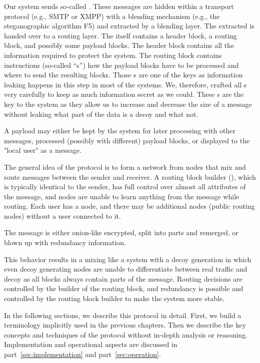 Our system sends so-called \VortexMessages. These messages are hidden within a transport protocol (e.g., SMTP or XMPP) with a blending mechanism (e.g., the steganographic algorithm F5) and extracted by a blending layer. The extracted \VortexMessage{} is handed over to a routing layer. The \VortexMessage{} itself contains a header block, a routing block, and possibly some payload blocks. The header block contains all the information required to protect the system. The routing block contains instructions (so-called ``s'') how the payload blocks have to be processed and where to send the resulting blocks. Those s are one of the keys as information leaking happens in this step in most of the systems. We, therefore, crafted all s very carefully to keep as much information secret as we could. These s are the key to the system as they allow us to increase and decrease the size of a message without leaking what part of the data is a decoy and what not.

A payload may either be kept by the system for later processing with other messages, processed (possibly with different) payload blocks, or displayed to the "local user" as a message.

The general idea of the protocol is to form a network from nodes that mix and route messages between the sender and receiver. A routing block builder (), which is typically identical to the sender, has full control over almost all attributes of the message, and nodes are unable to learn anything from the message while routing. Each user has a node, and there may be additional nodes (public routing nodes) without a user connected to it. 

The message is either onion-like encrypted, split into parts and remerged, or blown up with redundancy information. 

This behavior results in a mixing like a system with a decoy generation in which even decoy generating nodes are unable to differentiate between real traffic and decoy as all blocks always contain parts of the message. Routing decisions are controlled by the builder of the routing block, and redundancy is possible and controlled by the routing block builder to make the system more stable.

In the following sections, we describe this protocol in detail. First, we build a terminology implicitly used in the previous chapters. Then we describe the key concepts and techniques of the protocol without in-depth analysis or reasoning. Implementation and operational aspects are discussed in part~\ref{sec:implementation} and part~\ref{sec:operation}. 


